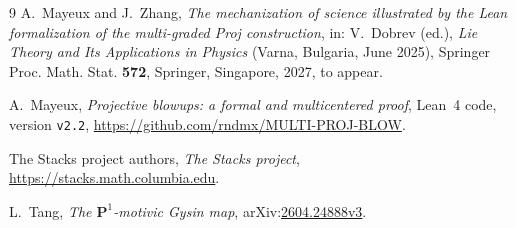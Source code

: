\documentclass[pdflatex,sn-mathphys-num]{sn-jnl}
\theoremstyle{plain}
\theoremstyle{definition}
\begin{document}
\begin{thebibliography}{9}
A.~Mayeux and J.~Zhang,
\emph{The mechanization of science illustrated by the Lean formalization of
the multi-graded Proj construction},
in: V.~Dobrev (ed.), \emph{Lie Theory and Its Applications in Physics}
(Varna, Bulgaria, June 2025), Springer Proc. Math. Stat. \textbf{572},
Springer, Singapore, 2027, to appear.

A.~Mayeux,
\emph{Projective blowups: a formal and multicentered proof}, Lean~4 code,
version \texttt{v2.2}, \url{https://github.com/rndmx/MULTI-PROJ-BLOW}.

The Stacks project authors,
\emph{The Stacks project},
\url{https://stacks.math.columbia.edu}.

L.~Tang,
\emph{The $\mathbf{P}^1$-motivic Gysin map},
arXiv:\href{https://arxiv.org/abs/2604.24888v3}{2604.24888v3}.
\end{thebibliography}
\end{document}
